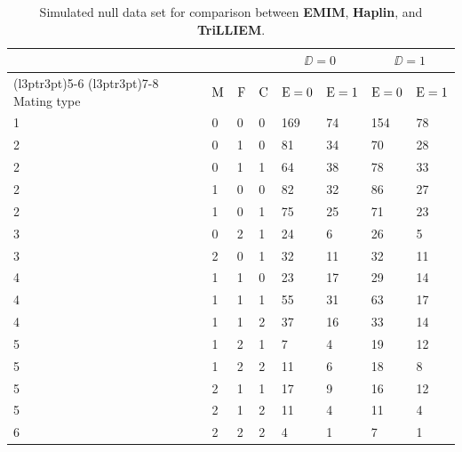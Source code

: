 \begin{table}[H]

\caption{\label{tab:consistencydat}Simulated null data set for comparison between \textbf{EMIM}, \textbf{Haplin}, and \textbf{TriLLIEM}.}
\centering
\begin{tabular}[t]{llllllll}
\toprule
\multicolumn{4}{c}{ } & \multicolumn{2}{c}{$\DD=0$} & \multicolumn{2}{c}{$\DD=1$} \\
\cmidrule(l{3pt}r{3pt}){5-6} \cmidrule(l{3pt}r{3pt}){7-8}
Mating type & ${\rm M}$ & ${\rm F}$ & ${\rm C}$ & ${\rm E}=0$ & ${\rm E}=1$ & ${\rm E}=0$ & ${\rm E}=1$\\
\midrule
1 & 0 & 0 & 0 & 169 & 74 & 154 & 78\\
2 & 0 & 1 & 0 & 81 & 34 & 70 & 28\\
2 & 0 & 1 & 1 & 64 & 38 & 78 & 33\\
2 & 1 & 0 & 0 & 82 & 32 & 86 & 27\\
2 & 1 & 0 & 1 & 75 & 25 & 71 & 23\\
3 & 0 & 2 & 1 & 24 & 6 & 26 & 5\\
3 & 2 & 0 & 1 & 32 & 11 & 32 & 11\\
4 & 1 & 1 & 0 & 23 & 17 & 29 & 14\\
4 & 1 & 1 & 1 & 55 & 31 & 63 & 17\\
4 & 1 & 1 & 2 & 37 & 16 & 33 & 14\\
5 & 1 & 2 & 1 & 7 & 4 & 19 & 12\\
5 & 1 & 2 & 2 & 11 & 6 & 18 & 8\\
5 & 2 & 1 & 1 & 17 & 9 & 16 & 12\\
5 & 2 & 1 & 2 & 11 & 4 & 11 & 4\\
6 & 2 & 2 & 2 & 4 & 1 & 7 & 1\\
\bottomrule
\end{tabular}
\end{table}